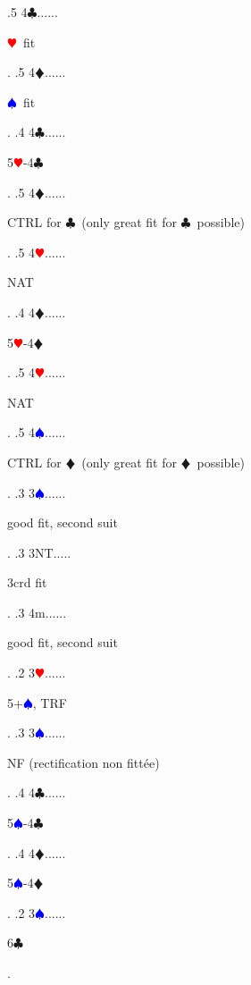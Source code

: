 \documentclass[a4paper]{article}
\newcommand{\BC}{\textcolor{OliveGreen}{$\clubsuit$}}
\newcommand{\BD}{\textcolor{RedOrange}{$\vardiamondsuit$}}
\newcommand{\BH}{\textcolor{Red}{$\varheartsuit${}}}
\newcommand{\BS}{\textcolor{Blue}{$\spadesuit${}}}
\begin{document}
{ .5 4\BC......\begin{minipage}[t]{0.8\textwidth}
\BH\ fit
\end{minipage}. 
 .5 4\BD......\begin{minipage}[t]{0.8\textwidth}
\BS\ fit
\end{minipage}. 
 .4 4\BC......\begin{minipage}[t]{0.8\textwidth}
5\BH -4\BC 
\end{minipage}. 
 .5 4\BD......\begin{minipage}[t]{0.8\textwidth}
CTRL for \BC\ (only great fit for \BC\ possible)
\end{minipage}. 
 .5 4\BH......\begin{minipage}[t]{0.8\textwidth}
NAT
\end{minipage}. 
 .4 4\BD......\begin{minipage}[t]{0.8\textwidth}
5\BH -4\BD 
\end{minipage}. 
 .5 4\BH......\begin{minipage}[t]{0.8\textwidth}
NAT
\end{minipage}. 
 .5 4\BS......\begin{minipage}[t]{0.8\textwidth}
CTRL for \BD\ (only great fit for \BD\ possible)
\end{minipage}. 
 .3 3\BS......\begin{minipage}[t]{0.8\textwidth}
good fit, second suit
\end{minipage}. 
 .3 3NT.....\begin{minipage}[t]{0.8\textwidth}
3crd fit
\end{minipage}. 
 .3 4m......\begin{minipage}[t]{0.8\textwidth}
good fit, second suit
\end{minipage}. 
 .2 3\BH......\begin{minipage}[t]{0.8\textwidth}
5+\BS , TRF
\end{minipage}. 
 .3 3\BS......\begin{minipage}[t]{0.8\textwidth}
NF (rectification non fittée)
\end{minipage}. 
 .4 4\BC......\begin{minipage}[t]{0.8\textwidth}
5\BS -4\BC 
\end{minipage}. 
 .4 4\BD......\begin{minipage}[t]{0.8\textwidth}
5\BS -4\BD 
\end{minipage}. 
 .2 3\BS......\begin{minipage}[t]{0.8\textwidth}
6\BC 
\end{minipage}. 
}
\end{document}
